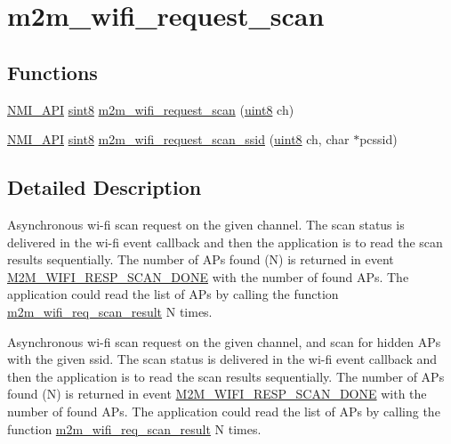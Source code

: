 \hypertarget{group__WifiRequestScanFn}{}\section{m2m\+\_\+wifi\+\_\+request\+\_\+scan}
\label{group__WifiRequestScanFn}
\subsection*{Functions}
\begin{DoxyCompactItemize}
\item 
\hyperlink{group__BSPDefine_gaecc0323d771e41ef81a76b5f12783e22}{N\+M\+I\+\_\+\+A\+PI} \hyperlink{group__DataT_gae35f10ffd0ac8dd2bc3e794da9bdfbc7}{sint8} \hyperlink{group__WifiRequestScanFn_ga499dfa24a19c2e84776aeabedf897135}{m2m\+\_\+wifi\+\_\+request\+\_\+scan} (\hyperlink{group__DataT_ga4df709a77647e870bbf1d955b8edc9a6}{uint8} ch)
\item 
\hyperlink{group__BSPDefine_gaecc0323d771e41ef81a76b5f12783e22}{N\+M\+I\+\_\+\+A\+PI} \hyperlink{group__DataT_gae35f10ffd0ac8dd2bc3e794da9bdfbc7}{sint8} \hyperlink{group__WifiRequestScanFn_gac02213169dee5603574c3f364345f1f6}{m2m\+\_\+wifi\+\_\+request\+\_\+scan\+\_\+ssid} (\hyperlink{group__DataT_ga4df709a77647e870bbf1d955b8edc9a6}{uint8} ch, char $\ast$pcssid)
\end{DoxyCompactItemize}


\subsection{Detailed Description}
Asynchronous wi-\/fi scan request on the given channel. The scan status is delivered in the wi-\/fi event callback and then the application is to read the scan results sequentially. The number of A\+Ps found (N) is returned in event \hyperlink{group__WlanEnums_gga064de09dec1d5e88ed8d075fa40f57dead835febbe18b7e3cc6ce4693951354fe}{M2\+M\+\_\+\+W\+I\+F\+I\+\_\+\+R\+E\+S\+P\+\_\+\+S\+C\+A\+N\+\_\+\+D\+O\+NE} with the number of found A\+Ps. The application could read the list of A\+Ps by calling the function \hyperlink{group__WifiReqScanResult_ga2585ee08ee8ecac67155ec99dd4d0863}{m2m\+\_\+wifi\+\_\+req\+\_\+scan\+\_\+result} N times.

Asynchronous wi-\/fi scan request on the given channel, and scan for hidden A\+Ps with the given ssid. The scan status is delivered in the wi-\/fi event callback and then the application is to read the scan results sequentially. The number of A\+Ps found (N) is returned in event \hyperlink{group__WlanEnums_gga064de09dec1d5e88ed8d075fa40f57dead835febbe18b7e3cc6ce4693951354fe}{M2\+M\+\_\+\+W\+I\+F\+I\+\_\+\+R\+E\+S\+P\+\_\+\+S\+C\+A\+N\+\_\+\+D\+O\+NE} with the number of found A\+Ps. The application could read the list of A\+Ps by calling the function \hyperlink{group__WifiReqScanResult_ga2585ee08ee8ecac67155ec99dd4d0863}{m2m\+\_\+wifi\+\_\+req\+\_\+scan\+\_\+result} N times. 

